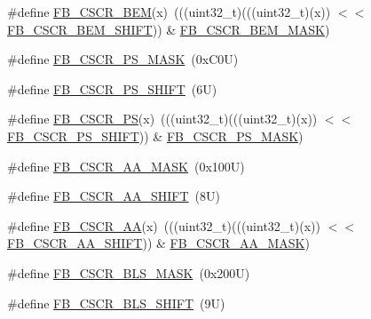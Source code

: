 \begin{DoxyCompactItemize}
\#define \mbox{\hyperlink{group___f_b___register___masks_gaf525cd59a21b651ef524c1ca5773342f}{F\+B\+\_\+\+C\+S\+C\+R\+\_\+\+B\+EM}}(x)~(((uint32\+\_\+t)(((uint32\+\_\+t)(x)) $<$$<$ \mbox{\hyperlink{group___f_b___register___masks_ga2dd3f47a9401af7ae8838b7dc7c379f8}{F\+B\+\_\+\+C\+S\+C\+R\+\_\+\+B\+E\+M\+\_\+\+S\+H\+I\+FT}})) \& \mbox{\hyperlink{group___f_b___register___masks_gaef7f70f7c6d39c8e1de2a16ccb4b3ccb}{F\+B\+\_\+\+C\+S\+C\+R\+\_\+\+B\+E\+M\+\_\+\+M\+A\+SK}})
\item 
\#define \mbox{\hyperlink{group___f_b___register___masks_ga07623c4ea4b4dfdc64c7dc0431719350}{F\+B\+\_\+\+C\+S\+C\+R\+\_\+\+P\+S\+\_\+\+M\+A\+SK}}~(0x\+C0\+U)
\item 
\#define \mbox{\hyperlink{group___f_b___register___masks_ga2cd33266c104fc645dcadaea7e659aa8}{F\+B\+\_\+\+C\+S\+C\+R\+\_\+\+P\+S\+\_\+\+S\+H\+I\+FT}}~(6\+U)
\item 
\#define \mbox{\hyperlink{group___f_b___register___masks_ga2268294cb3a73b4f9643e72aba119dec}{F\+B\+\_\+\+C\+S\+C\+R\+\_\+\+PS}}(x)~(((uint32\+\_\+t)(((uint32\+\_\+t)(x)) $<$$<$ \mbox{\hyperlink{group___f_b___register___masks_ga2cd33266c104fc645dcadaea7e659aa8}{F\+B\+\_\+\+C\+S\+C\+R\+\_\+\+P\+S\+\_\+\+S\+H\+I\+FT}})) \& \mbox{\hyperlink{group___f_b___register___masks_ga07623c4ea4b4dfdc64c7dc0431719350}{F\+B\+\_\+\+C\+S\+C\+R\+\_\+\+P\+S\+\_\+\+M\+A\+SK}})
\item 
\#define \mbox{\hyperlink{group___f_b___register___masks_gae26d2b6451432c0000d30a23e541020f}{F\+B\+\_\+\+C\+S\+C\+R\+\_\+\+A\+A\+\_\+\+M\+A\+SK}}~(0x100\+U)
\item 
\#define \mbox{\hyperlink{group___f_b___register___masks_gaf3d9d750b7dddf0d1df65c98d7ecc7e1}{F\+B\+\_\+\+C\+S\+C\+R\+\_\+\+A\+A\+\_\+\+S\+H\+I\+FT}}~(8\+U)
\item 
\#define \mbox{\hyperlink{group___f_b___register___masks_gac43bc0dc493b248de98c2e39808baf57}{F\+B\+\_\+\+C\+S\+C\+R\+\_\+\+AA}}(x)~(((uint32\+\_\+t)(((uint32\+\_\+t)(x)) $<$$<$ \mbox{\hyperlink{group___f_b___register___masks_gaf3d9d750b7dddf0d1df65c98d7ecc7e1}{F\+B\+\_\+\+C\+S\+C\+R\+\_\+\+A\+A\+\_\+\+S\+H\+I\+FT}})) \& \mbox{\hyperlink{group___f_b___register___masks_gae26d2b6451432c0000d30a23e541020f}{F\+B\+\_\+\+C\+S\+C\+R\+\_\+\+A\+A\+\_\+\+M\+A\+SK}})
\item 
\#define \mbox{\hyperlink{group___f_b___register___masks_gac8f4e3d4dba2c5e902c51e82cd870d9f}{F\+B\+\_\+\+C\+S\+C\+R\+\_\+\+B\+L\+S\+\_\+\+M\+A\+SK}}~(0x200\+U)
\item 
\#define \mbox{\hyperlink{group___f_b___register___masks_gabbdaea319c238ce8fc0ba6d79e29b411}{F\+B\+\_\+\+C\+S\+C\+R\+\_\+\+B\+L\+S\+\_\+\+S\+H\+I\+FT}}~(9\+U)
$$
\end{DoxyCompactItemize}
